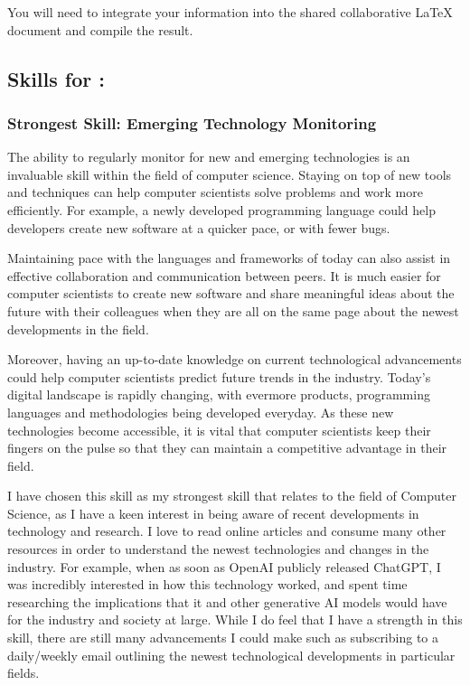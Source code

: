 \documentclass[a4paper, 11pt]{report}
\begin{document}
You will need to integrate your information into the shared collaborative LaTeX document and compile the result.

\subsection{Skills for \majA: \studA}

\subsubsection{Strongest Skill: Emerging Technology Monitoring \cite{sfia}}

The ability to regularly monitor for new and emerging technologies is an invaluable skill within the field of computer science. Staying on top of new tools and techniques can help computer scientists solve problems and work more efficiently. For example, a newly developed programming language could help developers create new software at a quicker pace, or with fewer bugs.

Maintaining pace with the languages and frameworks of today can also assist in effective collaboration and communication between peers. It is much easier for computer scientists to create new software and share meaningful ideas about the future with their colleagues when they are all on the same page about the newest developments in the field. 

Moreover, having an up-to-date knowledge on current technological advancements could help computer scientists predict future trends in the industry. Today’s digital landscape is rapidly changing, with evermore products, programming languages and methodologies being developed everyday. As these new technologies become accessible, it is vital that computer scientists keep their fingers on the pulse so that they can maintain a competitive advantage in their field.

I have chosen this skill as my strongest skill that relates to the field of Computer Science, as I have a keen interest in being aware of recent developments in technology and research. I love to read online articles and consume many other resources in order to understand the newest technologies and changes in the industry. For example, when as soon as OpenAI publicly released ChatGPT, I was incredibly interested in how this technology worked, and spent time researching the implications that it and other generative AI models would have for the industry and society at large. While I do feel that I have a strength in this skill, there are still many advancements I could make such as subscribing to a daily/weekly email outlining the newest technological developments in particular fields.
\end{document}
